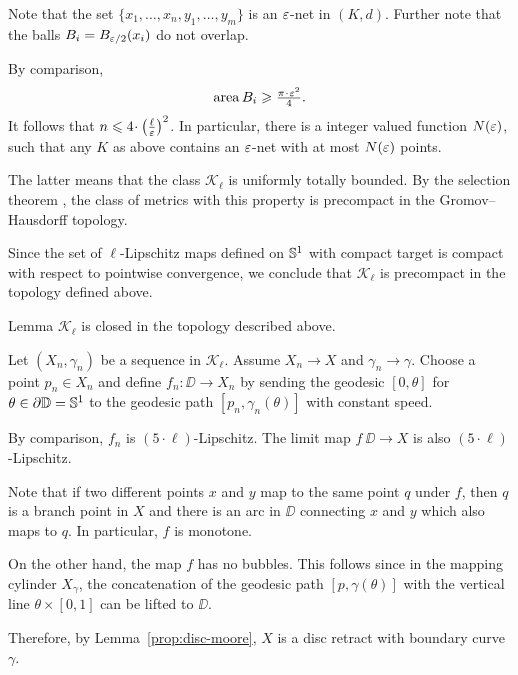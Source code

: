 Note that the set $\{x_1,\dots,x_n,y_1,\dots,y_m\}$
is an $\varepsilon$-net in $(K,d)$.
Further note that the balls $B_i=B_{\varepsilon/2}(x_i)$
do not overlap.

By comparison,
\[\area B_i\ge \tfrac{\pi\cdot\eps^2}{4}.\]
It follows that $n\le 4\cdot\left(\tfrac\ell\eps\right)^2$.
In particular, there is a integer valued function $N(\varepsilon)$, such that any  
$K$ as above contains an $\varepsilon$-net
with at most $N(\varepsilon)$ points.

The latter means that the class $\mathcal{K}_\ell$ is uniformly totally bounded.
By the selection theorem \cite[7.4.15]{BBI}, the class of metrics with this property is precompact in the Gromov--Hausdorff topology.

Since the set of $\ell$-Lipschitz maps defined on $\mathbb{S}^1$ with compact target is compact 
with respect to pointwise convergence, we conclude that $\mathcal{K}_\ell$ is precompact in the topology defined above. 
\qeds





\begin{thm}{Lemma}\label{lem:closed}
$\mathcal{K}_\ell$ is closed in the topology described above.
\end{thm}

Let $(X_n,\gamma_n)$ be a sequence in $\mathcal{K}_\ell$.
Assume $X_n\to X$ and $\gamma_n\to\gamma$. 
Choose a point $p_n\in X_n$ and define
$f_n:\DD\to X_n$ by sending the geodesic $[0,\theta]$ for $\theta\in\partial \mathbb{D}=\mathbb{S}^1$ to the geodesic path $[p_n,\gamma_n(\theta)]$ with constant speed. 

By comparison, $f_n$ is $(5\cdot\ell)$-Lipschitz. %
The limit map $f\:\DD\to X$ is also $(5\cdot\ell)$-Lipschitz.

Note that if two different points $x$  and $y$ map to the same point $q$ under $f$, then $q$ is a branch point in $X$ 
and there is an arc in $\DD$ connecting 
$x$ and $y$ which also maps to $q$. 
In particular, $f$ is monotone.

On the other hand, the map $f$ has no bubbles.
This follows since in the mapping cylinder $X_\gamma$, the concatenation of the geodesic path $[p,\gamma(\theta)]$ 
with the vertical line $\theta\times [0,1]$ can be lifted to $\DD$.

Therefore, by Lemma~\ref{prop:disc-moore}, $X$ is a disc retract with boundary curve $\gamma$.
\qeds
